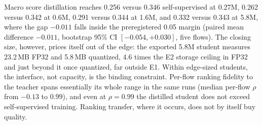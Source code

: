 \documentclass[pdflatex,sn-basic,Numbered]{sn-jnl}
\begin{document}
Macro score distillation reaches 0.256 versus 0.346 self-supervised at
0.27M, 0.262 versus 0.342 at 0.6M, 0.291 versus 0.344 at 1.6M, and
0.332 versus 0.343 at 5.8M, where the gap $-0.011$ falls inside the
preregistered 0.05 margin (paired mean difference $-0.011$, bootstrap
95\% CI $[-0.054, +0.030]$, five flows).
The closing size, however, prices itself out of the edge: the exported
5.8M student measures 23.2\,MB FP32 and 5.8\,MB quantized,
4.6 times the E2 storage ceiling in FP32 and just beyond it once quantized,
far outside E1.
Within edge-sized students, the interface, not capacity, is the
binding constraint.
Per-flow ranking fidelity to the teacher spans essentially its whole
range in the same runs (median per-flow $\rho$ from $-0.13$ to $0.99$),
and even at $\rho=0.99$ the distilled student does not exceed
self-supervised training.
Ranking transfer, where it occurs, does not by itself buy quality.
\end{document}
